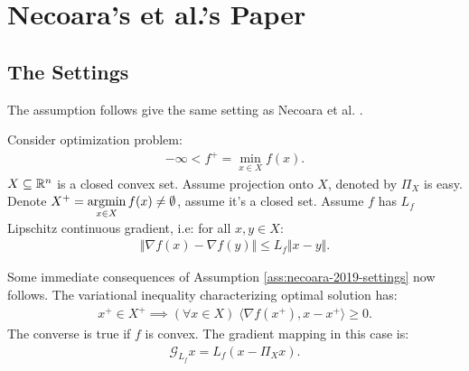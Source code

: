 \documentclass[12pt]{report}
\begin{document}
    \section{Necoara's et al.'s Paper}
        \subsection{The Settings}
            The assumption follows give the same setting as Necoara et al. \cite{necoara_linear_2019}. 
            \begin{assumption}\label{ass:necoara-2019-settings}
                Consider optimization problem: 
                \begin{align}
                    -\infty < f^+ = \min_{x \in X} f(x) . 
                \end{align}\label{problem:necoara-2019}
                $X\subseteq \mathbb R^n$ is a closed convex set. 
                Assume projection onto $X$, denoted by $\Pi_X$ is easy. 
                Denote $X^+ = \mathop{\rm argmin}\limits_{x \in X}f(x) \neq \emptyset$, assume it's a closed set. 
                Assume $f$ has $L_f$ Lipschitz continuous gradient, i.e: for all $x, y\in X$: 
                \begin{align*}
                    \Vert \nabla f(x) - \nabla f(y)\Vert \le L_f\Vert x - y\Vert. 
                \end{align*}
            \end{assumption}
            Some immediate consequences of Assumption \ref{ass:necoara-2019-settings} now follows. 
            The variational inequality characterizing optimal solution has: 
            \begin{align}\label{ineq:pg-opt-cond}
                x^+ \in X^+ \implies 
                (\forall x \in X)\; \langle \nabla f(x^+), x - x^+\rangle \ge 0. 
            \end{align}
            The converse is true if $f$ is convex. 
            The gradient mapping in this case is: 
            \begin{align*}
                \mathcal G_{L_f}x = L_f(x - \Pi_{X}x). 
            \end{align*}
\end{document}
